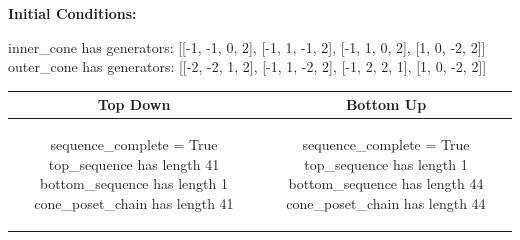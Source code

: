 \documentclass[10pt]{article}
\begin{document}
\textbf{Initial Conditions:}
\begin{SAGE}
inner_cone has generators: 
[[-1, -1, 0, 2], [-1, 1, -1, 2], [-1, 1, 0, 2], [1, 0, -2, 2]]
outer_cone has generators: 
[[-2, -2, 1, 2], [-1, 1, -2, 2], [-1, 2, 2, 1], [1, 0, -2, 2]]

\end{SAGE}
\begin{tabular}{c|c}
\textbf{Top Down} & \textbf{Bottom Up} \\ \hline  
\begin{SAGE}
sequence_complete = True
top_sequence has length 41
bottom_sequence has length 1
cone_poset_chain has length 41
\end{SAGE} 
&
\begin{SAGE}
sequence_complete = True
top_sequence has length 1
bottom_sequence has length 44
cone_poset_chain has length 44
\end{SAGE} 
\\ \hline


\end{tabular}
\end{document}
